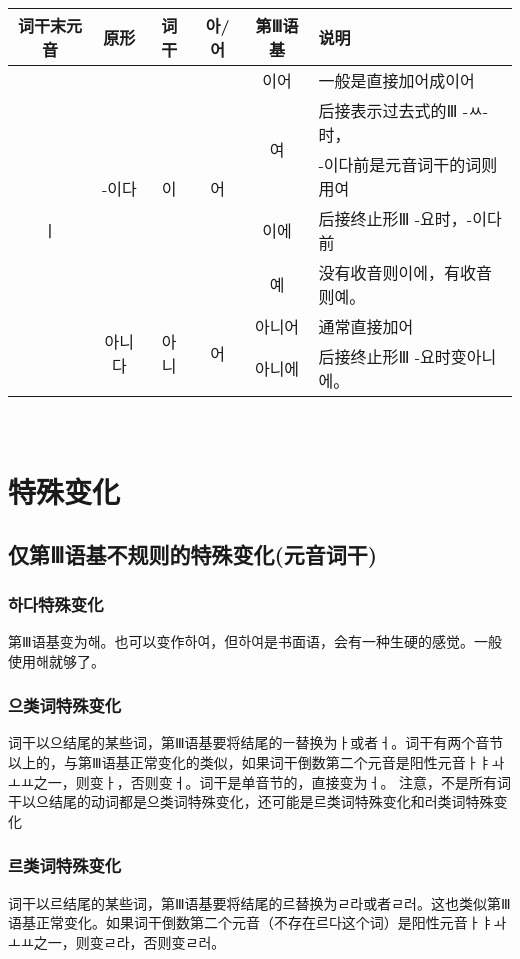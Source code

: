 \begin{tabular}{|c|c|c|c|c|l|}
    \hline
    词干末元音&原形&词干&아/어&第Ⅲ语基&说明\\\hline
    \multirow{7}{*}{ㅣ}&\multirow{5}{*}{-이다}&\multirow{5}{*}{이}&\multirow{5}{*}{어}&이어&一般是直接加어成이어\\\cline{5-6}
    &&&&\multirow{2}{*}{여}&后接表示过去式的Ⅲ -ㅆ-时，\\
    &&&&&-이다前是元音词干的词则用여\\\cline{5-6}
    &&&&이에&后接终止形Ⅲ -요时，-이다前\\\cline{5-5}
    &&&&예&没有收音则이에，有收音则예。\\\cline{2-6}
    &\multirow{2}{*}{아니다}&\multirow{2}{*}{아니}&\multirow{2}{*}{어}&아니어&通常直接加어\\\cline{5-6}
    &&&&아니에&后接终止形Ⅲ -요时变아니에。\\\hline
\end{tabular}\\
\section{特殊变化}\label{eogi:bk}
\subsection{仅第Ⅲ语基不规则的特殊变化(元音词干)}
\subsubsection{하다特殊变化}\label{eogi:hata}
第Ⅲ语基变为해。也可以变作하여，但하여是书面语，会有一种生硬的感觉。一般使用해就够了。
\subsubsection{으类词特殊变化}\label{eogi:eu}
词干以으结尾的某些词，第Ⅲ语基要将结尾的ㅡ替换为ㅏ或者ㅓ。词干有两个音节以上的，与第Ⅲ语基正常变化的类似，如果词干倒数第二个元音是阳性元音ㅏㅑㅘㅗㅛ之一，则变ㅏ，否则变ㅓ。词干是单音节的，直接变为ㅓ。{\color{red} 注意，不是所有词干以으结尾的动词都是으类词特殊变化，还可能是르类词特殊变化和러类词特殊变化} 
\subsubsection{르类词特殊变化}%
词干以르结尾的某些词，第Ⅲ语基要将结尾的르替换为ㄹ라或者ㄹ러。这也类似第Ⅲ语基正常变化。如果词干倒数第二个元音（不存在르다这个词）是阳性元音ㅏㅑㅘㅗㅛ之一，则变ㄹ라，否则变ㄹ러。
